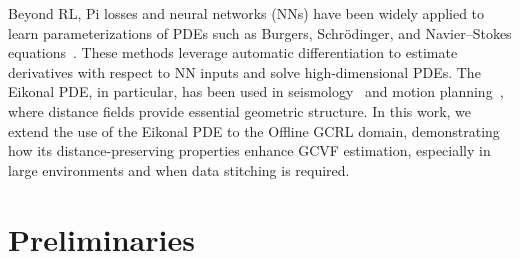 \documentclass{article}
\theoremstyle{plain}
\theoremstyle{definition}
\theoremstyle{remark}
\begin{document}
Beyond RL, Pi losses and neural networks (NNs) have been widely applied to learn parameterizations of PDEs such as Burgers, Schrödinger, and Navier–Stokes equations~\cite{rudy2017data, raissi2019physics}. These methods leverage automatic differentiation to estimate derivatives with respect to NN inputs and solve high-dimensional PDEs. The Eikonal PDE, in particular, has been used in seismology~\cite{smith2020eikonet} and motion planning~\cite{nintfields, anonymous2025physicsinformed}, where distance fields provide essential geometric structure. In this work, we extend the use of the Eikonal PDE to the Offline GCRL domain, demonstrating how its distance-preserving properties enhance GCVF estimation, especially in large environments and when data stitching is required.

\vspace{-0.0cm}
\section{Preliminaries}
\label{sec:Preliminarie}

\vspace{-0.0cm}
\end{document}
